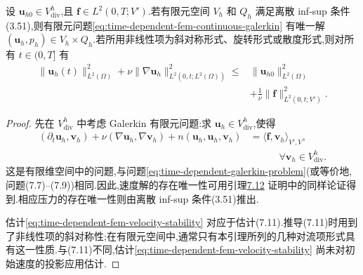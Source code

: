 \begin{lemma}[有限元解的存在唯一性与稳定性]
\label{lem:time-dependent-fem-solution-stability}
设 $\bm{u}_{h0}\in V_{\mathrm{div}}^h$,且
$\bm{f}\in L^2(0,T;V')$.若有限元空间 $V_h$ 和 $Q_h$ 满足离散 inf-sup 条件(3.51),则有限元问题\cref{eq:time-dependent-fem-continuous-galerkin} 有唯一解 $(\bm{u}_h,p_h)\in V_h\times Q_h$.若所用非线性项为斜对称形式、旋转形式或散度形式,则对所有 $t\in(0,T]$ 有
\begin{equation}\label{eq:time-dependent-fem-velocity-stability}
\begin{aligned}
  \|\bm{u}_h(t)\|_{L^2(\Omega)}^2
    +\nu\|\nabla\bm{u}_h\|_{L^2(0,t;L^2(\Omega))}^2
  \le{}&\|\bm{u}_{h0}\|_{L^2(\Omega)}^2\\
    &+\frac{1}{\nu}\|\bm{f}\|_{L^2(0,t;V')}^2.
\end{aligned}
\end{equation}
\begin{proof}
先在 $V_{\mathrm{div}}^h$ 中考虑 Galerkin 有限元问题:求
$\bm{u}_h\in V_{\mathrm{div}}^h$,使得
\[
\begin{aligned}
  (\partial_t\bm{u}_h,\bm{v}_h)
    +\nu(\nabla\bm{u}_h,\nabla\bm{v}_h)
    +n(\bm{u}_h,\bm{u}_h,\bm{v}_h)
  &=\langle\bm{f},\bm{v}_h\rangle_{V',V},\\
  &\hspace{3em}\forall\bm{v}_h\in V_{\mathrm{div}}^h.
\end{aligned}
\]
这是有限维空间中的问题,与问题\cref{eq:time-dependent-galerkin-problem}(或等价地,问题(7.7)–(7.9))相同.因此,速度解的存在唯一性可用引理\hyperref[lem:time-dependent-galerkin-unique]{7.12} 证明中的同样论证得到.相应压力的存在唯一性则由离散 inf-sup 条件(3.51)推出.

估计\cref{eq:time-dependent-fem-velocity-stability} 对应于估计(7.11).推导(7.11)时用到了非线性项的斜对称性;在有限元空间中,通常只有本引理所列的几种对流项形式具有这一性质.与(7.11)不同,估计\cref{eq:time-dependent-fem-velocity-stability} 尚未对初始速度的投影应用估计.
\end{proof}
\end{lemma}

